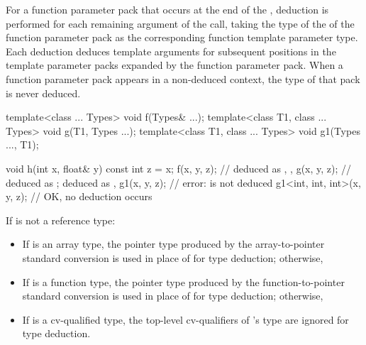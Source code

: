For a function parameter pack that occurs at the end
of the ,
deduction is performed for each remaining argument of the call,
taking the type 
of the  of the function parameter pack
as the corresponding function template parameter type.
Each deduction deduces template arguments for subsequent positions in
the template parameter packs expanded by the function parameter pack.
When a function parameter pack appears in a non-deduced
context, the type of that pack is
never deduced.
\begin{example}
\begin{codeblock}
template<class ... Types> void f(Types& ...);
template<class T1, class ... Types> void g(T1, Types ...);
template<class T1, class ... Types> void g1(Types ..., T1);

void h(int x, float& y) {
  const int z = x;
  f(x, y, z);                   //  deduced as , , 
  g(x, y, z);                   //  deduced as ;  deduced as , 
  g1(x, y, z);                  // error:  is not deduced
  g1<int, int, int>(x, y, z);   // OK, no deduction occurs
}
\end{codeblock}
\end{example}

\pnum
If
is not a reference type:

\begin{itemize}
\item
If
is an array type, the pointer type produced by the array-to-pointer
standard conversion is used in place of
for type deduction;
otherwise,
\item
If
is a function type, the pointer type produced by the
function-to-pointer standard conversion is used in place
of
for type
deduction; otherwise,
\item
If
is a cv-qualified type, the top-level cv-qualifiers of
's
type are ignored for type deduction.
\end{itemize}

